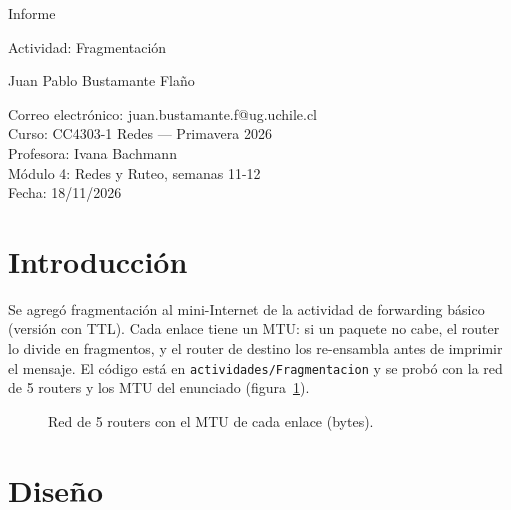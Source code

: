 \documentclass[11pt,letterpaper]{article}
\newcommand{\curso}{CC4303-1 Redes}
\newcommand{\tituloinforme}{Actividad: Fragmentación}
\begin{document}
\begin{titlepage}
  \thispagestyle{portada}
  \centering
  \vspace*{5cm}
  {\LARGE Informe\par}
  \vspace{0.3cm}
  {\Large \tituloinforme\par}
  \vspace{0.4cm}
  {\large Juan Pablo Bustamante Flaño\par}
  \vfill
  Correo electrónico: juan.bustamante.f@ug.uchile.cl\\
  Curso: \curso{} --- Primavera 2026\\
  Profesora: Ivana Bachmann\\
  Módulo 4: Redes y Ruteo, semanas 11-12\\
  Fecha: 18/11/2026
  \vspace*{3cm}
\end{titlepage}

\section{Introducción}

Se agregó fragmentación al mini-Internet de la actividad de forwarding básico (versión con
TTL). Cada enlace tiene un MTU: si un paquete no cabe, el router lo divide en fragmentos, y
el router de destino los re-ensambla antes de imprimir el mensaje. El código está en
\texttt{actividades/Fragmentacion} y se probó con la red de 5 routers y los MTU del
enunciado (figura~\ref{fig:red}).

\begin{figure}[H]
\centering
{}
\caption{Red de 5 routers con el MTU de cada enlace (bytes).}
\label{fig:red}
\end{figure}

\section{Diseño}
\end{document}
